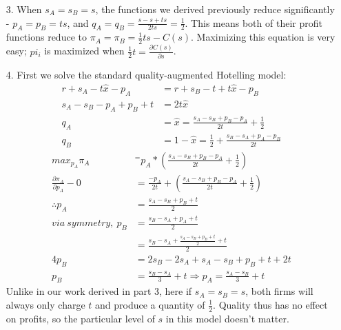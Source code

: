\documentclass[12pt,letterpaper]{article}
\begin{document}
\begin{enumerate}
\begin{enumerate}

	\item[3.]
	When $s_A = s_B = s$, the functions we derived previously reduce significantly - $p_A = p_B = ts$, and $q_A = q_B = \frac{s - s + ts}{2ts} = \frac{1}{2}$. This means both of their profit functions reduce to $\pi_A = \pi_B = \frac{1}{2}ts - C(s)$. Maximizing this equation is very easy; $pi_i$ is maximized when $\frac{1}{2}t = \frac{\partial C(s)}{\partial s}$.
	\item[4.] First we solve the standard quality-augmented Hotelling model:
	\begin{align*}
		r + s_A - t\hat{x} - p_A &= r + s_B - t + t\hat{x} - p_B \\
		s_A - s_B - p_A + p_B + t&= 2t\hat{x} \\
		q_A &= \hat{x} = \frac{s_A -s_B + p_B - p_A}{2t} + \frac{1}{2} \\
		q_B &= 1 - \hat{x} = \frac{1}{2} + \frac{s_B - s_A + p_A - p_B}{2t}
	\end{align*} 
	\begin{align*}
		max_{p_A} \pi_A &^= p_A * (\frac{s_A -s_B + p_B - p_A}{2t} + \frac{1}{2}) \\
		\frac{\partial \pi_A}{\partial p_A} - 0 &= \frac{-p_A}{2t} + (\frac{s_A -s_B + p_B - p_A}{2t} + \frac{1}{2}) \\
		\therefore p_A &= \frac{s_A - s_B + p_B + t}{2} \\
		via\ symmetry,\ p_B &= \frac{s_B - s_A + p_A + t}{2} \\
		&= \frac{s_B - s_A + \frac{s_A - s_B + p_B + t}{2} + t}{2} \\
		4p_B &= 2s_B - 2s_A + s_A - s_B + p_B + t + 2t \\
		p_B &= \frac{s_B - s_A}{3} + t \Rightarrow p_A = \frac{s_A - s_B}{3} + t
	\end{align*}
	Unlike in our work derived in part 3, here if $s_A = s_B = s$, both firms will always only charge $t$ and produce a quantity of $\frac{1}{2}$. Quality thus has no effect on profits, so the particular level of $s$ in this model doesn't matter.
\end{enumerate}

\end{enumerate}
	
\end{document}
